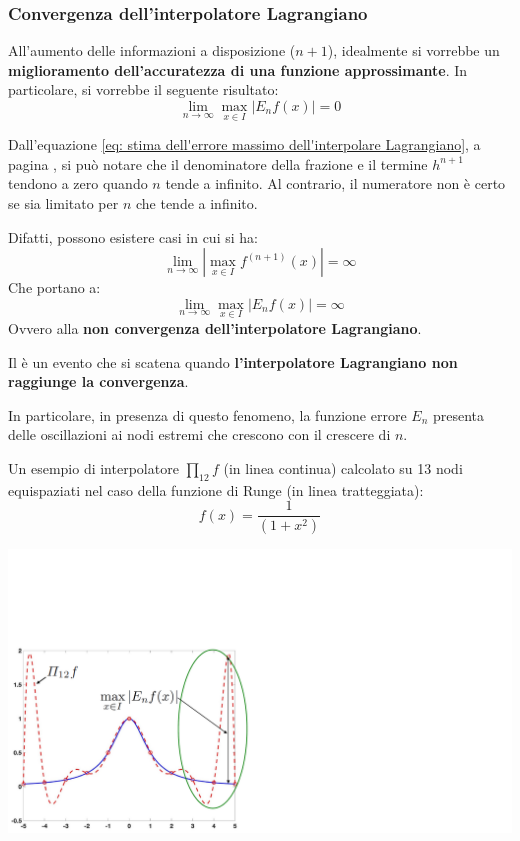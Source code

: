 \newpage

\subsubsection{Convergenza dell'interpolatore Lagrangiano}

All'aumento delle informazioni a disposizione ($n+1$), idealmente si vorrebbe un \textbf{miglioramento dell'accuratezza di una funzione approssimante}. In particolare, si vorrebbe il seguente risultato:
\begin{equation*}
	\lim\limits_{n \rightarrow \infty} \underset{x \in I}{\max} \left|E_{n}f\left(x\right)\right| = 0
\end{equation*}

\highspace
Dall'equazione \ref{eq: stima dell'errore massimo dell'interpolare Lagrangiano}, a pagina \pageref{eq: stima dell'errore massimo dell'interpolare Lagrangiano}, si può notare che il denominatore della frazione e il termine $h^{n+1}$ tendono a zero quando $n$ tende a infinito. Al contrario, il numeratore non è certo se sia limitato per $n$ che tende a infinito.

\highspace
Difatti, possono esistere casi in cui si ha:
\begin{equation*}
	\lim\limits_{n \rightarrow \infty} \left|\underset{x \in I}{\max} f^{\left(n+1\right)}\left(x\right)\right| = \infty
\end{equation*}
Che portano a:
\begin{equation*}
	\lim\limits_{n \rightarrow \infty} \underset{x \in I}{\max} \left|E_{n} f\left(x\right)\right| = \infty
\end{equation*}
Ovvero alla \textbf{non convergenza dell'interpolatore Lagrangiano}.

\begin{examplebox}
	Il  è un evento che si scatena quando \textbf{l'interpolatore Lagrangiano non raggiunge la convergenza}.
	
	In particolare, in presenza di questo fenomeno, la funzione errore $E_{n}$ presenta delle oscillazioni ai nodi estremi che crescono con il crescere di $n$.
	
	Un esempio di interpolatore $\prod_{12} f$ (in linea continua) calcolato su 13 nodi equispaziati nel caso della funzione di Runge (in linea tratteggiata):
	\begin{equation*}
		f\left(x\right) = \dfrac{1}{\left(1+x^{2}\right)}
	\end{equation*}
	\begin{center}
		\includegraphics[width=.7\textwidth]{img/fenomeno-di-runge-1.pdf}
	\end{center}
\end{examplebox}